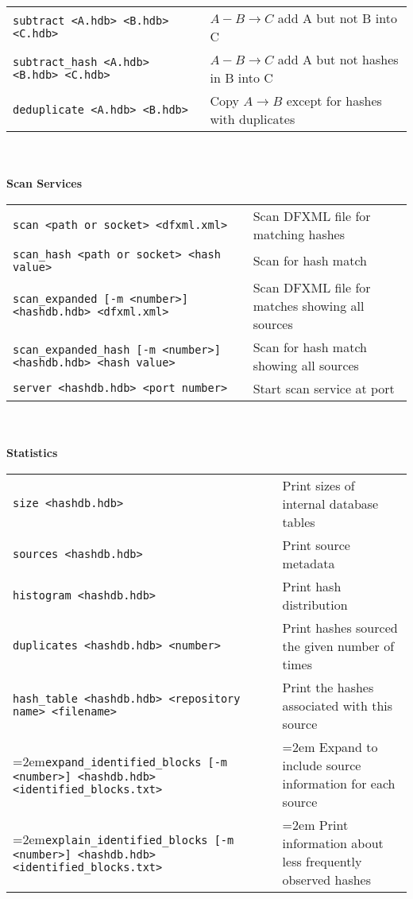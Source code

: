 \begin{small}
\begin{footnotesize}
\begin{tabular}{p{3.6 in} p{3.0 in}}
\texttt{subtract <A.hdb> <B.hdb> <C.hdb>} & $A - B \rightarrow C$ add A but not B into C\\
\texttt{subtract\_hash <A.hdb> <B.hdb> <C.hdb>} & $A - B \rightarrow C$ add A but not hashes in B into C\\
\texttt{deduplicate <A.hdb> <B.hdb>} & Copy $A \rightarrow B$ except for hashes with duplicates \\
\end{tabular}
\\
\\
\textbf{Scan Services} \\
\begin{tabular}{p{3.6 in} p{3.0 in}}
\texttt{scan <path or socket> <dfxml.xml>} & Scan DFXML file for matching hashes \\
\texttt{scan\_hash <path or socket> <hash value>} & Scan for hash match \\
\texttt{scan\_expanded [-m <number>] <hashdb.hdb> <dfxml.xml>} & Scan DFXML file for matches showing all sources\\
\texttt{scan\_expanded\_hash [-m <number>] <hashdb.hdb> <hash value>} & Scan for hash match showing all sources\\
\texttt{server <hashdb.hdb> <port number>} & Start scan service at port\\
\end{tabular}
\\
\\
\textbf{Statistics}\\
\begin{tabular}{p{3.6 in} p{3.0 in}}
\texttt{size <hashdb.hdb>} & Print sizes of internal database tables \\
\texttt{sources <hashdb.hdb>} & Print source metadata \\
\texttt{histogram <hashdb.hdb>} & Print hash distribution \\
\texttt{duplicates <hashdb.hdb> <number>} & Print hashes sourced the given number of times \\
\texttt{hash\_table <hashdb.hdb> <repository name> <filename>} & Print the hashes associated with this source\\
\hangindent=2em\texttt{expand\_identified\_blocks [-m <number>] <hashdb.hdb> <identified\_blocks.txt>} & \hangindent=2em Expand to include source information for each source \\
\hangindent=2em\texttt{explain\_identified\_blocks [-m <number>] <hashdb.hdb> <identified\_blocks.txt>} & \hangindent=2em Print information about less frequently observed hashes\\

\end{tabular}
\end{footnotesize}
\end{small}
